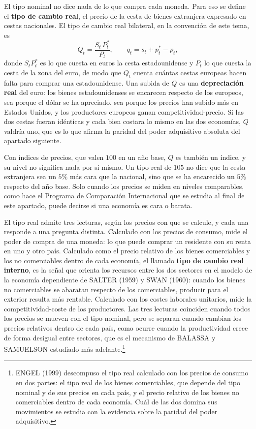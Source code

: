 \documentclass[10pt,a4paper]{article}
\begin{document}
El tipo nominal no dice nada de lo que compra cada moneda. Para eso se define el \textbf{tipo de cambio real}, el precio de la cesta de bienes extranjera expresado en cestas nacionales. El tipo de cambio real bilateral, en la convención de este tema, es
$$Q_t=\frac{S_t\,P_t^*}{P_t},\qquad q_t=s_t+p_t^*-p_t,$$
donde $S_tP_t^*$ es lo que cuesta en euros la cesta estadounidense y $P_t$ lo que cuesta la cesta de la zona del euro, de modo que $Q_t$ cuenta cuántas cestas europeas hacen falta para comprar una estadounidense. Una subida de $Q$ es una \textbf{depreciación real} del euro: los bienes estadounidenses se encarecen respecto de los europeos, sea porque el dólar se ha apreciado, sea porque los precios han subido más en Estados Unidos, y los productores europeos ganan competitividad-precio. Si las dos cestas fueran idénticas y cada bien costara lo mismo en las dos economías, $Q$ valdría uno, que es lo que afirma la paridad del poder adquisitivo absoluta del apartado siguiente.

Con índices de precios, que valen $100$ en un año base, $Q$ es también un índice, y su nivel no significa nada por sí mismo. Un tipo real de $105$ no dice que la cesta extranjera sea un $5\%$ más cara que la nacional, sino que se ha encarecido un $5\%$ respecto del año base. Solo cuando los precios se miden en niveles comparables, como hace el Programa de Comparación Internacional que se estudia al final de este apartado, puede decirse si una economía es cara o barata.

El tipo real admite tres lecturas, según los precios con que se calcule, y cada una responde a una pregunta distinta. Calculado con los precios de consumo, mide el poder de compra de una moneda: lo que puede comprar un residente con su renta en uno y otro país. Calculado como el precio relativo de los bienes comerciables y los no comerciables dentro de cada economía, el llamado \textbf{tipo de cambio real interno}, es la señal que orienta los recursos entre los dos sectores en el modelo de la economía dependiente de SALTER (1959) y SWAN (1960): cuando los bienes no comerciables se abaratan respecto de los comerciables, producir para el exterior resulta más rentable. Calculado con los costes laborales unitarios, mide la competitividad-coste de los productores. Las tres lecturas coinciden cuando todos los precios se mueven con el tipo nominal, pero se separan cuando cambian los precios relativos dentro de cada país, como ocurre cuando la productividad crece de forma desigual entre sectores, que es el mecanismo de BALASSA y SAMUELSON estudiado más adelante.\footnote{%
    ENGEL (1999) descompuso el tipo real calculado con los precios de consumo en dos partes: el tipo real de los bienes comerciables, que depende del tipo nominal y de sus precios en cada país, y el precio relativo de los bienes no comerciables dentro de cada economía. Cuál de las dos domina sus movimientos se estudia con la evidencia sobre la paridad del poder adquisitivo.
}
\end{document}
